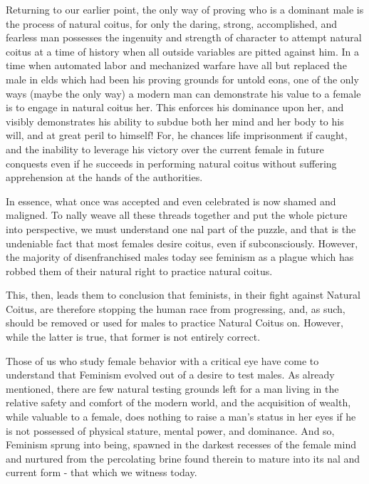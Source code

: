 Returning to our earlier point, the only way of proving who is a dominant male is the process of natural coitus, for only the daring, strong, accomplished, and fearless man possesses the ingenuity and strength of character to attempt natural coitus at a time of history when all outside variables are pitted against him. In a time when automated labor and mechanized warfare have all but replaced the male in elds which had been his proving grounds for untold eons, one of the only ways (maybe the only way) a modern man can demonstrate his value to a female is to engage in natural coitus her. This enforces his dominance upon her, and visibly demonstrates his ability to subdue both her mind and her body to his will, and at great peril to himself! For, he chances life imprisonment if caught, and the inability to leverage his victory over the current female in future conquests even if he succeeds in performing natural coitus without suffering apprehension at the hands of the authorities.



In essence, what once was accepted and even celebrated is now shamed and maligned.
To nally weave all these threads together and put the whole picture into perspective, we must understand one nal part of the puzzle, and that is the undeniable fact that most females desire coitus, even if subconsciously. However, the majority of disenfranchised males today see feminism as a plague which has robbed them of their natural right to practice natural coitus.



This, then, leads them to conclusion that feminists, in their fight against Natural Coitus, are therefore stopping the human race from progressing, and, as such, should be removed or used for males to practice Natural Coitus on. However, while the latter is true, that former is not
entirely correct.



Those of us who study female behavior with a critical eye have come to understand that Feminism evolved out of a desire to test males. As already mentioned, there are few natural testing grounds left for a man living in the relative safety and comfort of the modern world, and the acquisition of wealth, while valuable to a female, does nothing to raise a man's status in her eyes if he is not possessed of physical stature, mental power, and dominance. And so, Feminism sprung into being, spawned in the darkest recesses of the female mind and nurtured from the percolating brine found therein to mature into its nal and current form - that which we witness today.



